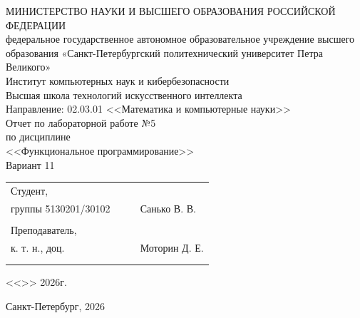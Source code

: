 \documentclass[a4paper, final]{article}
\begin{document}
	
	\begin{center}
		\hfill \break
		\hfill \break
		\normalsize{МИНИСТЕРСТВО НАУКИ И ВЫСШЕГО ОБРАЗОВАНИЯ РОССИЙСКОЙ ФЕДЕРАЦИИ\\
			федеральное государственное автономное образовательное учреждение высшего образования «Санкт-Петербургский политехнический университет Петра Великого»\\[10pt]}
		\normalsize{Институт компьютерных наук и кибербезопасности}\\[10pt] 
		\normalsize{Высшая школа технологий искусственного интеллекта}\\[10pt] 
		\normalsize{Направление: 02.03.01 <<Математика и компьютерные науки>>}\\
		
		\hfill \break
		\hfill \break
		\hfill \break
		\hfill \break
		\large{Отчет по лабораторной работе №5}\\
		\large{по дисциплине}\\
		\large{<<Функциональное программирование>>}\\
		\large{Вариант 11}\\
		\hfill \break
	\end{center}
	
	\small{ 
		\begin{tabular}{lrrl}
			\!\!\!Студент, & \hspace{2cm} & & \\
			\!\!\!группы 5130201/30102 & \hspace{2cm} & \underline{\hspace{3cm}} &Санько В. В. \\\\
			\!\!\!Преподаватель,\\ \hspace{-5pt}к. т. н., доц. & \hspace{2cm} &  \underline{\hspace{3cm}} &  Моторин Д. Е. \\\\
			&&\hspace{4cm}
		\end{tabular}
		\begin{flushright}
			<<\underline{\hspace{1cm}}>>\underline{\hspace{2.5cm}} 2026г.
		\end{flushright}
	}
	
	\hfill \break
	\vspace{3cm}
	\begin{center} \small{Санкт-Петербург, 2026} \end{center}
	\thispagestyle{empty}
	
\end{document}
